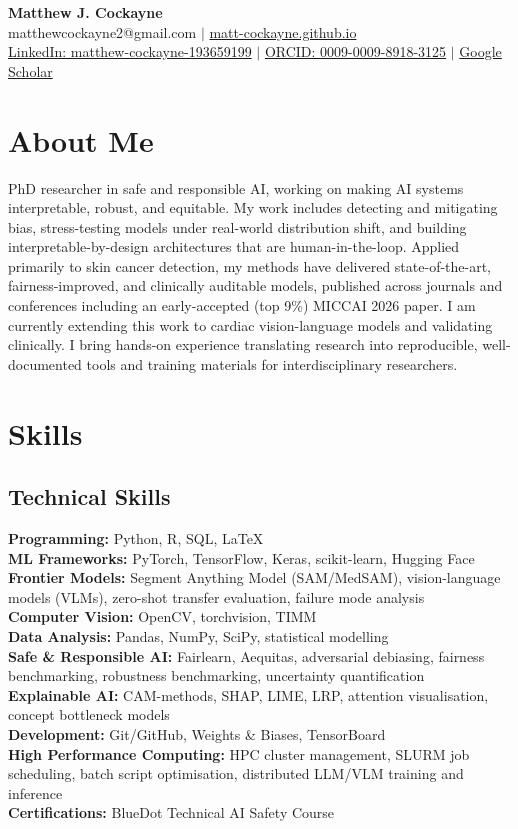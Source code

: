 \documentclass[10pt,a4paper]{article}
\begin{document}
{\centering
{\LARGE\textbf{Matthew J. Cockayne}}\\[2pt]
matthewcockayne2@gmail.com $\mid$ \href{https://matt-cockayne.github.io}{matt-cockayne.github.io}\\
\href{https://www.linkedin.com/in/matthew-cockayne-193659199}{LinkedIn: matthew-cockayne-193659199} $\mid$ \href{https://orcid.org/0009-0009-8918-3125}{ORCID: 0009-0009-8918-3125} $\mid$ \href{https://scholar.google.co.uk/citations?user=LcCOSxEAAAAJ&hl=en}{Google Scholar}\\[6pt]
}

\section{About Me}
PhD researcher in safe and responsible AI, working on making AI systems interpretable, robust, and equitable. My work includes detecting and mitigating bias, stress-testing models under real-world distribution shift, and building interpretable-by-design architectures that are human-in-the-loop. Applied primarily to skin cancer detection, my methods have delivered state-of-the-art, fairness-improved, and clinically auditable models, published across journals and conferences including an early-accepted (top 9\%) MICCAI 2026 paper. I am currently extending this work to cardiac vision-language models and validating clinically. I bring hands-on experience translating research into reproducible, well-documented tools and training materials for interdisciplinary researchers.

\section{Skills}

\subsection{Technical Skills}
\textbf{Programming:} Python, R, SQL, LaTeX \\
\textbf{ML Frameworks:} PyTorch, TensorFlow, Keras, scikit-learn, Hugging Face\\
\textbf{Frontier Models:} Segment Anything Model (SAM/MedSAM), vision-language models (VLMs), zero-shot transfer evaluation, failure mode analysis\\
\textbf{Computer Vision:} OpenCV, torchvision, TIMM\\
\textbf{Data Analysis:} Pandas, NumPy, SciPy, statistical modelling\\
\textbf{Safe \& Responsible AI:} Fairlearn, Aequitas, adversarial debiasing, fairness benchmarking, robustness benchmarking, uncertainty quantification\\
\textbf{Explainable AI:} CAM-methods, SHAP, LIME, LRP, attention visualisation, concept bottleneck models\\
\textbf{Development:} Git/GitHub, Weights \& Biases, TensorBoard\\
\textbf{High Performance Computing:} HPC cluster management, SLURM job scheduling, batch script optimisation, distributed LLM/VLM training and inference\\
\textbf{Certifications:} BlueDot Technical AI Safety Course
\end{document}
